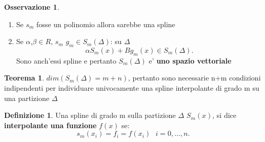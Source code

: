 \documentclass[11pt]{article}
\theoremstyle{definition}
\newtheorem{defn}{Definizione}
\newtheorem{oss}{Osservazione}
\newtheorem{thm}{Teorema}[section] %
\theoremstyle{plain}
\begin{document}
\begin{oss}
	\begin{enumerate}
		\item Se $s_m$ fosse un polinomio allora sarebbe una spline
		\item Se $\alpha$,$\beta\in R$, $s_m$ $g_m\in S_m(\varDelta)$: su $\varDelta$
			\[
				\alpha S_m(x)+Bg_m(x)\in S_m(\varDelta)
			.\] 
		Sono anch'essi spline e pertanto $S_m(\varDelta)$ e' \textbf{uno spazio vettoriale}
	\end{enumerate}
\end{oss}
\begin{thm}
	$dim(S_m(\varDelta)=m+n)$, pertanto sono necessarie n+m condizioni indipendenti per individuare univocamente una spline interpolante di grado m su una partizione $\varDelta$
\end{thm}
\begin{defn}
	Una spline di grado m sulla partizione $\varDelta$ $S_m(x)$, si dice \textbf{interpolante una funzione} $f(x)$ se:
	\[
		s_m(x_{i})=f_i=f(x_{i})\ \ \ i=0,...,n
	.\] 
\end{defn}
\end{document}
